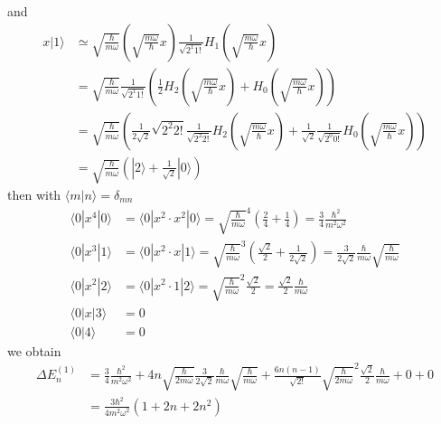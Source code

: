 \documentclass[10pt,a4paper]{book}
\theoremstyle{definition}
\begin{document}
and
\begin{align}
x|1\rangle
&\simeq \sqrt{\frac{\hbar}{m\omega}}\left(\sqrt{\frac{m\omega}{\hbar}}x\right)\frac{1}{\sqrt{2^1 1!}}H_1(\sqrt{\frac{m\omega}{\hbar}}x)\\
&=\sqrt{\frac{\hbar}{m\omega}}\frac{1}{\sqrt{2^1 1!}}\left(\frac{1}{2}H_2(\sqrt{\frac{m\omega}{\hbar}}x)+H_0(\sqrt{\frac{m\omega}{\hbar}}x)\right)\\
&=\sqrt{\frac{\hbar}{m\omega}}\left(\frac{1}{2\sqrt{2}}\sqrt{2^2 2!}\frac{1}{\sqrt{2^2 2!}}H_2(\sqrt{\frac{m\omega}{\hbar}}x)+\frac{1}{\sqrt{2}}\frac{1}{\sqrt{2^0 0!}}H_0(\sqrt{\frac{m\omega}{\hbar}}x)\right)\\
&=\sqrt{\frac{\hbar}{m\omega}}\left(|2\rangle+\frac{1}{\sqrt{2}}|0\rangle\right)
\end{align}
then with $\langle m|n\rangle=\delta_{mn}$
\begin{align}
\langle0|x^4|0\rangle
&=\langle0|x^2\cdot x^2|0\rangle
=\sqrt{\frac{\hbar}{m\omega}}^4\left(\frac{2}{4}+\frac{1}{4}\right)
=\frac{3}{4}\frac{\hbar^2}{m^2\omega^2}\\
\langle0|x^3|1\rangle
&=\langle0|x^2\cdot x|1\rangle
=\sqrt{\frac{\hbar}{m\omega}}^3\left(\frac{\sqrt{2}}{2}+\frac{1}{2\sqrt{2}}\right)
=\frac{3}{2\sqrt{2}}\frac{\hbar}{m\omega}\sqrt{\frac{\hbar}{m\omega}}\\
\langle0|x^2|2\rangle
&=\langle0|x^2\cdot 1|2\rangle
=\sqrt{\frac{\hbar}{m\omega}}^2\frac{\sqrt{2}}{2}=\frac{\sqrt{2}}{2}\frac{\hbar}{m\omega}\\
\langle0|x|3\rangle
&=0\\
\langle0|4\rangle
&=0
\end{align}
we obtain
\begin{align}
\Delta E^{(1)}_n
&=\frac{3}{4}\frac{\hbar^2}{m^2\omega^2}+4n\sqrt{\frac{\hbar}{2m\omega}}\frac{3}{2\sqrt{2}}\frac{\hbar}{m\omega}\sqrt{\frac{\hbar}{m\omega}}+\frac{6n(n-1)}{\sqrt{2!}}\sqrt{\frac{\hbar}{2m\omega}}^2\frac{\sqrt{2}}{2}\frac{\hbar}{m\omega}+0+0\\
&=\frac{3\hbar^2}{4m^2\omega^2}\left(1+2n+2n^2\right)
\end{align}
\end{document}
